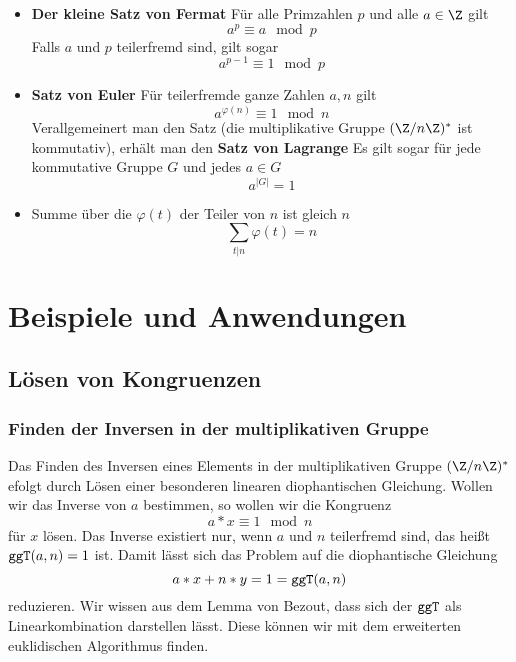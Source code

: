 \begin{itemize}
	\item \textbf{Der kleine Satz von Fermat} Für alle Primzahlen $p$ und alle $a\in\Z$ gilt
	\begin{equation*}
		a^p\equiv a\mod p
	\end{equation*}
	Falls $a$ und $p$ teilerfremd sind, gilt sogar
	\begin{equation*}
		a^{p-1}\equiv 1\mod p
	\end{equation*}

	\item \textbf{Satz von Euler} Für teilerfremde ganze Zahlen $a,n$ gilt
	\begin{equation*}
		a^{\varphi(n)}\equiv 1 \mod n
	\end{equation*}
	Verallgemeinert man den Satz (die multiplikative Gruppe $(\Z/n\Z)^\ast$ ist kommutativ), erhält man den \textbf{Satz von Lagrange} Es gilt sogar für jede kommutative Gruppe $G$ und jedes $a\in G$ 
	\begin{equation*}
	 	a^{|G|}=1
	\end{equation*} 

	\item Summe über die $\varphi(t)$ der Teiler von $n$ ist gleich $n$
	\begin{equation*}
		\sum_{t|n}\varphi(t)=n
	\end{equation*}
\end{itemize}


\section{Beispiele und Anwendungen}
\subsection{Lösen von Kongruenzen}
\subsubsection{Finden der Inversen in der multiplikativen Gruppe}
\label{subsubsec:inverse}
Das Finden des Inversen eines Elements in der multiplikativen Gruppe $(\Z/n\Z)^\ast$ efolgt durch Lösen einer besonderen linearen diophantischen Gleichung. Wollen wir das Inverse von $a$ bestimmen, so wollen wir die Kongruenz
\begin{equation*}
	a*x\equiv 1 \mod n
\end{equation*}
für $x$ lösen. Das Inverse existiert nur, wenn $a$ und $n$ teilerfremd sind, das heißt $\texttt{ggT}(a,n)=1$ ist. Damit lässt sich das Problem auf die diophantische Gleichung
\begin{equation*}
	a*x+n*y = 1 = \texttt{ggT}(a,n)
\end{equation*}
reduzieren. Wir wissen aus dem Lemma von Bezout, dass sich der $\texttt{ggT}$ als Linearkombination darstellen lässt. Diese können wir mit dem erweiterten euklidischen Algorithmus finden.
